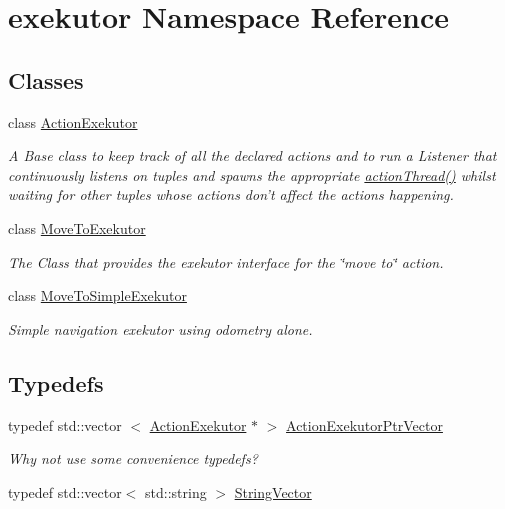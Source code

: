 \hypertarget{namespaceexekutor}{\section{exekutor \-Namespace \-Reference}
\label{namespaceexekutor}
}
\subsection*{\-Classes}
\begin{DoxyCompactItemize}
\item 
class \hyperlink{classexekutor_1_1ActionExekutor}{\-Action\-Exekutor}
\begin{DoxyCompactList}\small\item\em \-A \-Base class to keep track of all the declared actions and to run a \-Listener that continuously listens on tuples and spawns the appropriate \hyperlink{classexekutor_1_1ActionExekutor_ab80a1327f11113222157cfec0abd9e9b}{action\-Thread()} whilst waiting for other tuples whose actions don't affect the actions happening. \end{DoxyCompactList}\item 
class \hyperlink{classexekutor_1_1MoveToExekutor}{\-Move\-To\-Exekutor}
\begin{DoxyCompactList}\small\item\em \-The \-Class that provides the exekutor interface for the \char`\"{}move to\char`\"{} action. \end{DoxyCompactList}\item 
class \hyperlink{classexekutor_1_1MoveToSimpleExekutor}{\-Move\-To\-Simple\-Exekutor}
\begin{DoxyCompactList}\small\item\em \-Simple navigation exekutor using odometry alone. \end{DoxyCompactList}\end{DoxyCompactItemize}
\subsection*{\-Typedefs}
\begin{DoxyCompactItemize}
\item 
typedef std\-::vector\*
$<$ \hyperlink{classexekutor_1_1ActionExekutor}{\-Action\-Exekutor} $\ast$ $>$ \hyperlink{namespaceexekutor_a141a8f9a739e67ffb2356da18a653162}{\-Action\-Exekutor\-Ptr\-Vector}
\begin{DoxyCompactList}\small\item\em \-Why not use some convenience typedefs? \end{DoxyCompactList}\item 
typedef std\-::vector$<$ std\-::string $>$ \hyperlink{namespaceexekutor_a58d8a9cd227883a8eacb6400c9f62acb}{\-String\-Vector}
\end{DoxyCompactItemize}
